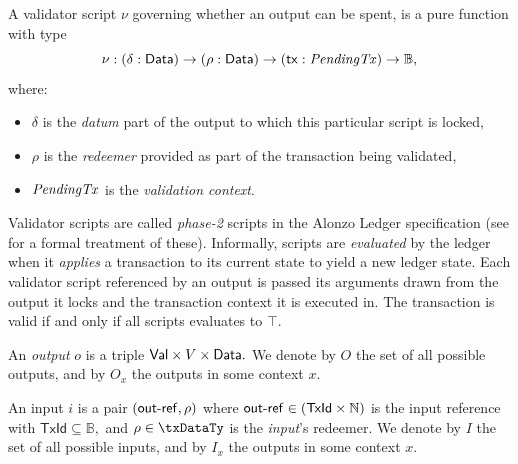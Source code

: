 \begin{definition}
  A validator script $\nu$ governing whether an output can be spent, is a pure
  function with type
  \[
    \nu : (\delta : \mathsf{Data}) \to (\rho : \mathsf{Data}) \to (\mathsf{tx} : \mathit{PendingTx}) \to\mathbb{B},
  \]
  where:
  \begin{itemize}
    \item $\delta$ is the \emph{datum} part of the output to which this
          particular script is locked,
    \item $\rho$ is the \emph{redeemer} provided as part of the transaction
          being validated,
    \item $\mathit{PendingTx}$ is the \emph{validation context}.
  \end{itemize}
\end{definition}

Validator scripts are called \emph{phase-2} scripts in the Alonzo Ledger specification (see \cite{alozon-spec} for a formal treatment of these). Informally, scripts are \emph{evaluated} by the ledger when it \emph{applies} a transaction to its current state to yield a new ledger state. Each validator script referenced by an output is passed its arguments drawn from the output it locks and the transaction context it is executed in. The transaction is valid if and only if all scripts evaluates to $\top.$

\begin{definition}[Outputs]
\label{def:outputs}
An \emph{output} $o$ is a triple $\mathsf{Val} \times V \times \mathsf{Data}.$
We denote by $O$ the set of all possible outputs, and by $O_x$ the outputs in some context $x$.
\end{definition}

\begin{definition}[Inputs]
An input $i$ is a pair $(\mathsf{out\textsf{-}{}ref}, \rho)$ where 
$\mathsf{out\textsf{-}{}ref} \in (\mathsf{TxId} \times \mathbb{N})$ is the input reference with $\mathsf{TxId} \subseteq \mathbb{B},$ and $\rho \in \txDataTy$ is the \emph{input}'s redeemer.  We denote by $I$ the set of all possible inputs, and by $I_x$ the outputs in some context $x$.
\end{definition}

